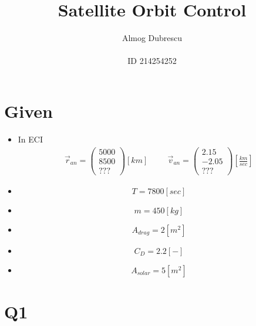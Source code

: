 \documentclass[11pt, a4paper]{article}
\title{Satellite Orbit Control}
\author{Almog Dubrescu\\\\ID 214254252}
\begin{document}
\maketitle

\thispagestyle{empty}
\newpage
\setcounter{page}{1}

\section{Given}
\begin{itemize}
    \item In ECI
    \begin{align*}
        \vec{r}_{an} = \begin{pmatrix}
            5000\\8500\\???
        \end{pmatrix} [km]
        \hspace{1cm}
        \vec{v}_{an} = \begin{pmatrix}
            2.15\\-2.05\\???
        \end{pmatrix} \left[\frac{km}{sec}\right]
    \end{align*}
    \item $$ T = 7800 [sec] $$
    \item $$ m = 450 [kg] $$
    \item $$ A_{drag} = 2 [m^2]$$
    \item $$ C_D = 2.2 [-]$$
    \item $$ A_{solar} = 5 [m^2]$$
\end{itemize}
\section{Q1}

\newpage
\end{document}
